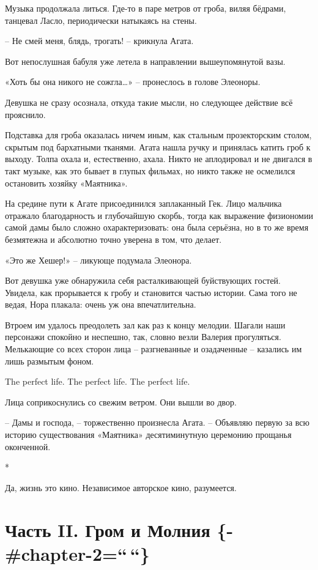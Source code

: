 \documentclass[
  a5paperpaper,
  DIV=11,
  numbers=noendperiod]{scrreprt}
\begin{document}
Музыка продолжала литься. Где-то в паре метров от гроба, виляя бёдрами,
танцевал Ласло, периодически натыкаясь на стены.

-- Не смей меня, блядь, трогать! -- крикнула Агата.

Вот непослушная бабуля уже летела в направлении вышеупомянутой вазы.

«Хоть бы она никого не сожгла\ldots» -- пронеслось в голове Элеоноры.

Девушка не сразу осознала, откуда такие мысли, но следующее действие всё
прояснило.

Подставка для гроба оказалась ничем иным, как стальным прозекторским
столом, скрытым под бархатными тканями. Агата нашла ручку и принялась
катить гроб к выходу. Толпа охала и, естественно, ахала. Никто не
аплодировал и не двигался в такт музыке, как это бывает в глупых
фильмах, но никто также не осмелился остановить хозяйку «Маятника».

На средине пути к Агате присоединился заплаканный Гек. Лицо мальчика
отражало благодарность и глубочайшую скорбь, тогда как выражение
физиономии самой дамы было сложно охарактеризовать: она была серьёзна,
но в то же время безмятежна и абсолютно точно уверена в том, что делает.

«Это же Хешер!» -- ликующе подумала Элеонора.

Вот девушка уже обнаружила себя расталкивающей буйствующих гостей.
Увидела, как прорывается к гробу и становится частью истории. Сама того
не ведая, Нора плакала: очень уж она впечатлительна.

Втроем им удалось преодолеть зал как раз к концу мелодии. Шагали наши
персонажи спокойно и неспешно, так, словно везли Валерия прогуляться.
Мелькающие со всех сторон лица -- разгневанные и озадаченные -- казались
им лишь размытым фоном.

The perfect life. The perfect life. The perfect life.

Лица соприкоснулись со свежим ветром. Они вышли во двор.

-- Дамы и господа, -- торжественно произнесла Агата. -- Объявляю первую
за всю историю существования «Маятника» десятиминутную церемонию
прощанья оконченной.

*

Да, жизнь это кино. Независимое авторское кино, разумеется.


\chapter{Часть II. Гром и Молния
\{-\#chapter-2=``\,``\}}\label{ux447ux430ux441ux442ux44c-ii.-ux433ux440ux43eux43c-ux438-ux43cux43eux43bux43dux438ux44f--chapter-2}
\end{document}
